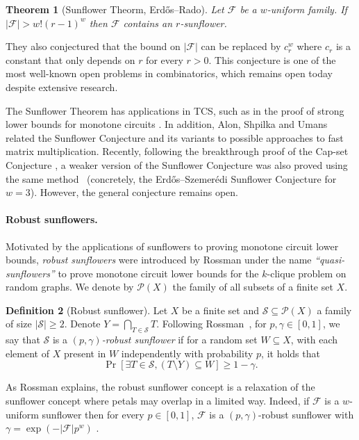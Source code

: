 \documentclass[11pt]{article}
\numberwithin{equation}{section}
\newtheorem{theorem}{Theorem}[section]
\theoremstyle{definition}
\newtheorem{definition}[theorem]{Definition}
\theoremstyle{plain}
\newcommand{\calF}{\mathcal{F}} %
\begin{document}
\begin{theorem}[Sunflower Theorm, 
Erd\H{o}s--Rado\cite{ErdosR1960}]  \label{thm:erdosrado}
Let $\calF$ be %
%
%
a $w$-uniform family.  %
If $|\calF| > w!(r-1)^w$  then $\calF$ contains an $r$-sunflower.
\end{theorem}

They also conjectured that the bound on $|\calF|$ can be replaced by
$c_r^w$ where $c_r$ is a constant that only depends on $r$ for every
$r>0$. This conjecture is one of the most well-known open problems in
combinatorics, which remains open today despite extensive research.

The Sunflower Theorem has applications in %
TCS,   %
such as
%
in the proof of %
strong lower bounds for monotone circuits \cite{Razborov1985}. In
addition, Alon,  Shpilka and Umans \cite{AlonSU2012} related the
Sunflower Conjecture and its variants to possible approaches to
fast matrix multiplication. Recently, following the breakthrough proof of the
Cap-set Conjecture \cite{CrootLP2017,EllenbergG2017}, a weaker version of the
Sunflower Conjecture was also proved using the same method~\cite{naslund2017upper} (concretely, the Erd\H{o}s--Szemer\'{e}di Sunflower Conjecture for $w=3$). However, the general conjecture remains open.

\paragraph{Robust sunflowers.} Motivated by the applications of sunflowers
%
to   %
proving monotone circuit lower bounds,
\emph{robust sunflowers}  %
were introduced by Rossman \cite{rossman2010monotone}
under the name \emph{``quasi-sunflowers''} %
to prove monotone circuit lower bounds for the $k$-clique problem
on random graphs. We denote by
$\mathcal{P}(X)$ the family of all subsets of a finite set $X$.

%

\begin{definition}[Robust sunflower\cite{rossman2010monotone}]
\label{def:qsflower}
Let $X$ be a finite set
and  %
$\mathcal{S}\subseteq\mathcal{P}(X)$
%
a family %
%
of size  %
$|\mathcal{S}|\geq 2$.
Denote $Y=\underset{T\in\mathcal{S}}\bigcap T$.
%
%
Following Rossman~\cite{rossman2010monotone}, for %
%
$p, \gamma \in [0, 1]$,
%
we say that $\mathcal{S}$ is   %
a \emph{$(p,\gamma)$-robust sunflower} %
if for a random set $W\subseteq X$,
with each element of $X$ present in $W$ independently with probability $p$,
it holds that
\[
\Pr\left[\exists T \in \mathcal{S}, (T \setminus Y ) \subseteq W \right] \geq 1 -\gamma. \]
\end{definition}
%
%
As Rossman explains, the robust sunflower concept is a relaxation
of the sunflower concept where petals may overlap in a limited way.
Indeed, if $\calF$ is a $w$-uniform sunflower then for every $p\in [0,1]$,
$\calF$ is a $(p,\gamma)$-robust sunflower with $\gamma =\exp(-|\calF| p^w)$
\cite[Remark 13]{rossman2010monotone}.  %
\end{document}
